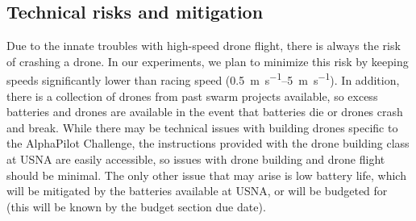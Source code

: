 \documentclass[onecolumn,10pt]{IEEEtran}
\begin{document}
\subsection{Technical risks and mitigation}
%

Due to the innate troubles with high-speed drone flight, there is always the risk of crashing a drone. In our experiments, we plan to minimize this risk by keeping speeds significantly lower than racing speed (\SIrange{0.5}{5}{\meter\per\second}). In addition, there is a collection of drones from past swarm projects available, so excess batteries and drones are available in the event that batteries die or drones crash and break. While there may be technical issues with building drones specific to the AlphaPilot Challenge, the instructions provided with the drone building class at USNA are easily accessible, so issues with drone building and drone flight should be minimal. The only other issue that may arise is low battery life, which will be mitigated by the batteries available at USNA, or will be budgeted for (this will be known by the budget section due date).

%
\end{document}
